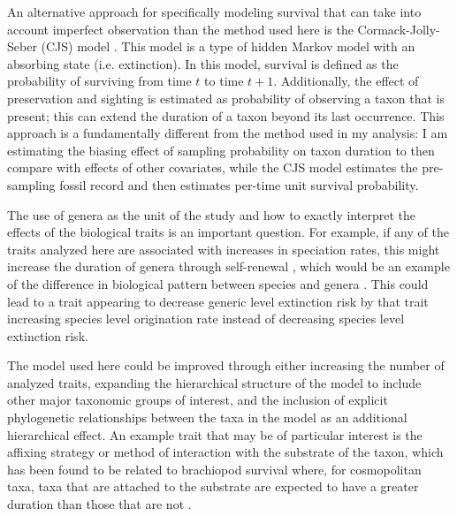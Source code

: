 \documentclass[11pt]{article}
\begin{document}
An alternative approach for specifically modeling survival that can take into account imperfect observation than the method used here is the Cormack-Jolly-Seber (CJS) model \citep{Royle2008,Liow2008,Tomiya2013,Liow2010b}. This model is a type of hidden Markov model with an absorbing state (i.e. extinction). In this model, survival is defined as the probability of surviving from time \(t\) to time \(t + 1\). Additionally, the effect of preservation and sighting is estimated as probability of observing a taxon that is present; this can extend the duration of a taxon beyond its last occurrence. This approach is a fundamentally different from the method used in my analysis: I am estimating the biasing effect of sampling probability on taxon duration to then compare with effects of other covariates, while the CJS model estimates the pre-sampling fossil record and then estimates per-time unit survival probability.

The use of genera as the unit of the study and how to exactly interpret the effects of the biological traits is an important question. For example, if any of the traits analyzed here are associated with increases in speciation rates, this might increase the duration of genera through self-renewal \citep{Raup1991b,Raup1994}, which would be an example of the difference in biological pattern between species and genera \citep{Jablonski1987,Jablonski2007,Jablonski2008a}. This could lead to a trait appearing to decrease generic level extinction risk by that trait increasing species level origination rate instead of decreasing species level extinction risk. %

The model used here could be improved through either increasing the number of analyzed traits, expanding the hierarchical structure of the model to include other major taxonomic groups of interest, and the inclusion of explicit phylogenetic relationships between the taxa in the model as an additional hierarchical effect. An example trait that may be of particular interest is the affixing strategy or method of interaction with the substrate of the taxon, which has been found to be related to brachiopod survival where, for cosmopolitan taxa, taxa that are attached to the substrate are expected to have a greater duration than those that are not \citep{Alexander1977}.
\end{document}
